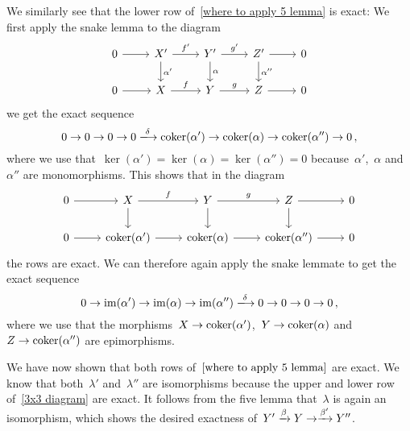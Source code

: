We similarly see that the lower row of~\eqref{where to apply 5 lemma} is exact:
We first apply the snake lemma to the diagram
\[
  \begin{tikzcd}
      0
      \arrow{r}
    & X'
      \arrow{r}[above]{f'}
      \arrow{d}[right]{\alpha'}
    & Y'
      \arrow{r}[above]{g'}
      \arrow{d}[right]{\alpha}
    & Z'
      \arrow{r}
      \arrow{d}[right]{\alpha''}
    & 0
    \\
      0
      \arrow{r}
    & X
      \arrow{r}[above]{f}
    & Y
      \arrow{r}[above]{g}
    & Z
      \arrow{r}
    & 0
  \end{tikzcd}
\]
we get the exact sequence
\[
  0
  \to
  0
  \to
  0
  \to
  0
  \xlongto{\delta}
  \coker(\alpha')
  \to
  \coker(\alpha)
  \to
  \coker(\alpha'')
  \to
  0 \,,
\]
where we use that~$\ker(\alpha') = \ker(\alpha) = \ker(\alpha'') = 0$ because~$\alpha'$,~$\alpha$ and~$\alpha''$ are monomorphisms.
This shows that in the diagram
\[
  \begin{tikzcd}
      0
      \arrow{r}
    & X
      \arrow{r}[above]{f}
      \arrow{d}
    & Y
      \arrow{r}[above]{g}
      \arrow{d}
    & Z
      \arrow{r}
      \arrow{d}
    & 0
    \\
      0
      \arrow{r}
    & \coker(\alpha')
      \arrow{r}
    & \coker(\alpha)
      \arrow{r}
    & \coker(\alpha'')
      \arrow{r}
    & 0
  \end{tikzcd}
\]
the rows are exact.
We can therefore again apply the snake lemmate to get the exact sequence
\[
  0
  \to
  \im(\alpha')
  \to
  \im(\alpha)
  \to
  \im(\alpha'')
  \xlongto{\delta}
  0
  \to
  0
  \to
  0
  \to
  0 \,,
\]
where we use that the morphisms~$X \to \operatorname{coker}(\alpha')$,~$Y \to \operatorname{coker}(\alpha)$ and~$Z \to \operatorname{coker}(\alpha'')$ are epimorphisms.

We have now shown that both rows of~$\eqref{where to apply 5 lemma}$ are exact.
We know that both~$\lambda'$ and~$\lambda''$ are isomorphisms because the upper and lower row of~\eqref{3x3 diagram} are exact.
It follows from the five lemma that~$\lambda$ is again an isomorphism, which shows the desired exactness of~$Y' \xrightarrow{\beta} Y \to \xrightarrow{\beta'} Y''$.









